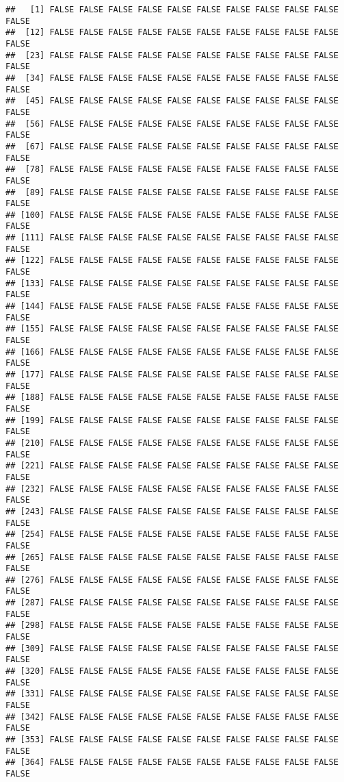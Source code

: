 \documentclass[]{article}
\begin{document}
\begin{verbatim}
##   [1] FALSE FALSE FALSE FALSE FALSE FALSE FALSE FALSE FALSE FALSE FALSE
##  [12] FALSE FALSE FALSE FALSE FALSE FALSE FALSE FALSE FALSE FALSE FALSE
##  [23] FALSE FALSE FALSE FALSE FALSE FALSE FALSE FALSE FALSE FALSE FALSE
##  [34] FALSE FALSE FALSE FALSE FALSE FALSE FALSE FALSE FALSE FALSE FALSE
##  [45] FALSE FALSE FALSE FALSE FALSE FALSE FALSE FALSE FALSE FALSE FALSE
##  [56] FALSE FALSE FALSE FALSE FALSE FALSE FALSE FALSE FALSE FALSE FALSE
##  [67] FALSE FALSE FALSE FALSE FALSE FALSE FALSE FALSE FALSE FALSE FALSE
##  [78] FALSE FALSE FALSE FALSE FALSE FALSE FALSE FALSE FALSE FALSE FALSE
##  [89] FALSE FALSE FALSE FALSE FALSE FALSE FALSE FALSE FALSE FALSE FALSE
## [100] FALSE FALSE FALSE FALSE FALSE FALSE FALSE FALSE FALSE FALSE FALSE
## [111] FALSE FALSE FALSE FALSE FALSE FALSE FALSE FALSE FALSE FALSE FALSE
## [122] FALSE FALSE FALSE FALSE FALSE FALSE FALSE FALSE FALSE FALSE FALSE
## [133] FALSE FALSE FALSE FALSE FALSE FALSE FALSE FALSE FALSE FALSE FALSE
## [144] FALSE FALSE FALSE FALSE FALSE FALSE FALSE FALSE FALSE FALSE FALSE
## [155] FALSE FALSE FALSE FALSE FALSE FALSE FALSE FALSE FALSE FALSE FALSE
## [166] FALSE FALSE FALSE FALSE FALSE FALSE FALSE FALSE FALSE FALSE FALSE
## [177] FALSE FALSE FALSE FALSE FALSE FALSE FALSE FALSE FALSE FALSE FALSE
## [188] FALSE FALSE FALSE FALSE FALSE FALSE FALSE FALSE FALSE FALSE FALSE
## [199] FALSE FALSE FALSE FALSE FALSE FALSE FALSE FALSE FALSE FALSE FALSE
## [210] FALSE FALSE FALSE FALSE FALSE FALSE FALSE FALSE FALSE FALSE FALSE
## [221] FALSE FALSE FALSE FALSE FALSE FALSE FALSE FALSE FALSE FALSE FALSE
## [232] FALSE FALSE FALSE FALSE FALSE FALSE FALSE FALSE FALSE FALSE FALSE
## [243] FALSE FALSE FALSE FALSE FALSE FALSE FALSE FALSE FALSE FALSE FALSE
## [254] FALSE FALSE FALSE FALSE FALSE FALSE FALSE FALSE FALSE FALSE FALSE
## [265] FALSE FALSE FALSE FALSE FALSE FALSE FALSE FALSE FALSE FALSE FALSE
## [276] FALSE FALSE FALSE FALSE FALSE FALSE FALSE FALSE FALSE FALSE FALSE
## [287] FALSE FALSE FALSE FALSE FALSE FALSE FALSE FALSE FALSE FALSE FALSE
## [298] FALSE FALSE FALSE FALSE FALSE FALSE FALSE FALSE FALSE FALSE FALSE
## [309] FALSE FALSE FALSE FALSE FALSE FALSE FALSE FALSE FALSE FALSE FALSE
## [320] FALSE FALSE FALSE FALSE FALSE FALSE FALSE FALSE FALSE FALSE FALSE
## [331] FALSE FALSE FALSE FALSE FALSE FALSE FALSE FALSE FALSE FALSE FALSE
## [342] FALSE FALSE FALSE FALSE FALSE FALSE FALSE FALSE FALSE FALSE FALSE
## [353] FALSE FALSE FALSE FALSE FALSE FALSE FALSE FALSE FALSE FALSE FALSE
## [364] FALSE FALSE FALSE FALSE FALSE FALSE FALSE FALSE FALSE FALSE FALSE

\end{verbatim}
\end{document}
